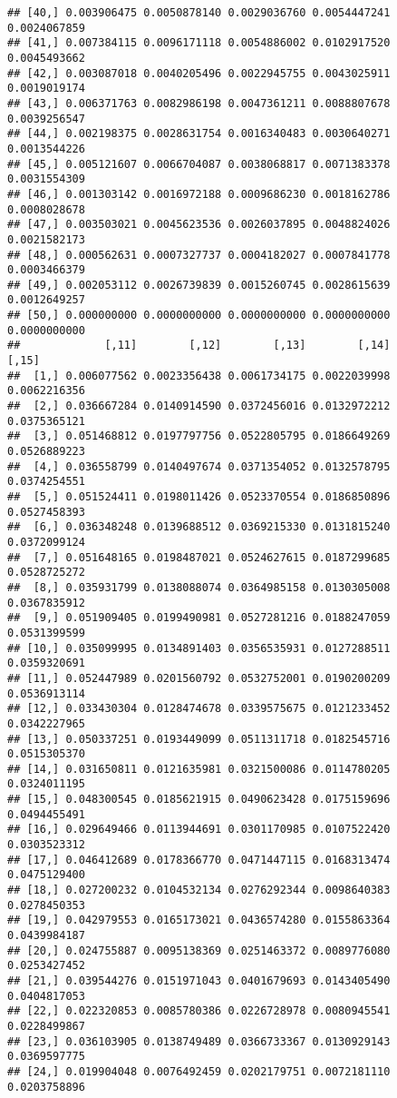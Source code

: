 \documentclass[]{article}
\begin{document}
\begin{verbatim}
## [40,] 0.003906475 0.0050878140 0.0029036760 0.0054447241 0.0024067859
## [41,] 0.007384115 0.0096171118 0.0054886002 0.0102917520 0.0045493662
## [42,] 0.003087018 0.0040205496 0.0022945755 0.0043025911 0.0019019174
## [43,] 0.006371763 0.0082986198 0.0047361211 0.0088807678 0.0039256547
## [44,] 0.002198375 0.0028631754 0.0016340483 0.0030640271 0.0013544226
## [45,] 0.005121607 0.0066704087 0.0038068817 0.0071383378 0.0031554309
## [46,] 0.001303142 0.0016972188 0.0009686230 0.0018162786 0.0008028678
## [47,] 0.003503021 0.0045623536 0.0026037895 0.0048824026 0.0021582173
## [48,] 0.000562631 0.0007327737 0.0004182027 0.0007841778 0.0003466379
## [49,] 0.002053112 0.0026739839 0.0015260745 0.0028615639 0.0012649257
## [50,] 0.000000000 0.0000000000 0.0000000000 0.0000000000 0.0000000000
##             [,11]        [,12]        [,13]        [,14]        [,15]
##  [1,] 0.006077562 0.0023356438 0.0061734175 0.0022039998 0.0062216356
##  [2,] 0.036667284 0.0140914590 0.0372456016 0.0132972212 0.0375365121
##  [3,] 0.051468812 0.0197797756 0.0522805795 0.0186649269 0.0526889223
##  [4,] 0.036558799 0.0140497674 0.0371354052 0.0132578795 0.0374254551
##  [5,] 0.051524411 0.0198011426 0.0523370554 0.0186850896 0.0527458393
##  [6,] 0.036348248 0.0139688512 0.0369215330 0.0131815240 0.0372099124
##  [7,] 0.051648165 0.0198487021 0.0524627615 0.0187299685 0.0528725272
##  [8,] 0.035931799 0.0138088074 0.0364985158 0.0130305008 0.0367835912
##  [9,] 0.051909405 0.0199490981 0.0527281216 0.0188247059 0.0531399599
## [10,] 0.035099995 0.0134891403 0.0356535931 0.0127288511 0.0359320691
## [11,] 0.052447989 0.0201560792 0.0532752001 0.0190200209 0.0536913114
## [12,] 0.033430304 0.0128474678 0.0339575675 0.0121233452 0.0342227965
## [13,] 0.050337251 0.0193449099 0.0511311718 0.0182545716 0.0515305370
## [14,] 0.031650811 0.0121635981 0.0321500086 0.0114780205 0.0324011195
## [15,] 0.048300545 0.0185621915 0.0490623428 0.0175159696 0.0494455491
## [16,] 0.029649466 0.0113944691 0.0301170985 0.0107522420 0.0303523312
## [17,] 0.046412689 0.0178366770 0.0471447115 0.0168313474 0.0475129400
## [18,] 0.027200232 0.0104532134 0.0276292344 0.0098640383 0.0278450353
## [19,] 0.042979553 0.0165173021 0.0436574280 0.0155863364 0.0439984187
## [20,] 0.024755887 0.0095138369 0.0251463372 0.0089776080 0.0253427452
## [21,] 0.039544276 0.0151971043 0.0401679693 0.0143405490 0.0404817053
## [22,] 0.022320853 0.0085780386 0.0226728978 0.0080945541 0.0228499867
## [23,] 0.036103905 0.0138749489 0.0366733367 0.0130929143 0.0369597775
## [24,] 0.019904048 0.0076492459 0.0202179751 0.0072181110 0.0203758896

\end{verbatim}
\end{document}
